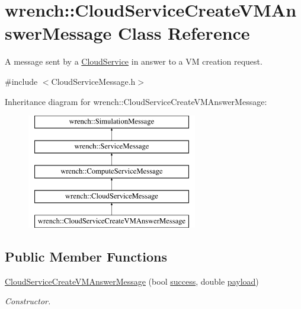 \hypertarget{classwrench_1_1_cloud_service_create_v_m_answer_message}{}\section{wrench\+:\+:Cloud\+Service\+Create\+V\+M\+Answer\+Message Class Reference}
\label{classwrench_1_1_cloud_service_create_v_m_answer_message}


A message sent by a \hyperlink{classwrench_1_1_cloud_service}{Cloud\+Service} in answer to a VM creation request.  




{\ttfamily \#include $<$Cloud\+Service\+Message.\+h$>$}

Inheritance diagram for wrench\+:\+:Cloud\+Service\+Create\+V\+M\+Answer\+Message\+:\begin{figure}[H]
\begin{center}
\leavevmode
\includegraphics[height=5.000000cm]{classwrench_1_1_cloud_service_create_v_m_answer_message}
\end{center}
\end{figure}
\subsection*{Public Member Functions}
\begin{DoxyCompactItemize}
\item 
\hyperlink{classwrench_1_1_cloud_service_create_v_m_answer_message_ad2584bdb77a7016cbd93461c32b8ec1e}{Cloud\+Service\+Create\+V\+M\+Answer\+Message} (bool \hyperlink{classwrench_1_1_cloud_service_create_v_m_answer_message_a9e641b442aa8543283bc63fc83df7f0d}{success}, double \hyperlink{classwrench_1_1_simulation_message_a914f2732713f7c02898e66f05a7cb8a1}{payload})
\begin{DoxyCompactList}\small\item\em Constructor. \end{DoxyCompactList}\end{DoxyCompactItemize}
